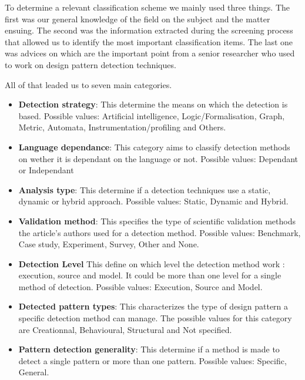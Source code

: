 \documentclass[letterpaper, 10 pt, conference]{ieeeconf}  %
\begin{document}
To determine a relevant classification scheme we mainly used three things.
The first was our general knowledge of the field on the subject and the matter
ensuing.
The second was the information extracted during the screening process that
allowed us to identify the most important classification items.
The last one was advices on which are the important point from a senior
researcher who used to work on design pattern detection techniques.

All of that leaded us to seven main categories.

\begin{itemize}
  \item \textbf{Detection strategy}:
    This determine the means on which the detection is based.
    Possible values: Artificial intelligence, Logic/Formalisation, Graph,
    Metric, Automata, Instrumentation/profiling and Others.

  \item \textbf{Language dependance}:
    This category aims to classify detection methods on wether it is dependant
    on the language or not. 
    Possible values: Dependant or Independant

  \item \textbf{Analysis type}:
    This determine if a detection techniques use a static, dynamic or hybrid
    approach.
    Possible values: Static, Dynamic and Hybrid.

  \item \textbf{Validation method}:
    This specifies the type of scientific validation methods the article's 
    authors used for a detection method.
    Possible values: Benchmark, Case study, Experiment, Survey, Other and
    None.
    
  \item \textbf{Detection Level}
    This define on which level the detection method work : execution, source
    and model.
    It could be more than one level for a single method of detection.
    Possible values: Execution, Source and Model.

  \item \textbf{Detected pattern types}:
    This characterizes the type of design pattern a specific detection method
    can manage.
    The possible values for this category are Creationnal, Behavioural,
    Structural and Not specified.

  \item \textbf{Pattern detection generality}:
    This determine if a method is made to detect a single pattern or more than
    one pattern.
    Possible values: Specific, General.
\end{itemize}
\end{document}

